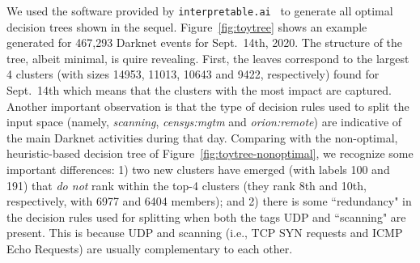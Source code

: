 \documentclass[manuscript, nonacm]{acmart}
\begin{document}
We used the software provided by \texttt{interpretable.ai}~\cite{interpretableai} to generate all optimal decision 
trees shown in the sequel. Figure~\ref{fig:toytree}
shows an example generated for 467,293 Darknet events for Sept.\ 14th, 2020. 
The structure of the tree, albeit minimal, is quire revealing.
First, the leaves correspond to the largest 4 clusters (with sizes
14953, 11013, 10643 and 9422, respectively) 
found for Sept.\ 14th which means that the clusters with the most impact are captured. 
Another important observation is that the type of decision rules used to split
the input space (namely, \emph{scanning}, \emph{censys:mgtm} and \emph{orion:remote})
are indicative of the main Darknet activities during that day. 
Comparing with the non-optimal, heuristic-based decision tree of Figure~\ref{fig:toytree-nonoptimal},
we recognize some important differences: 1) two new clusters have emerged (with labels 100 and 191)
that \emph{do not} rank within the top-4 clusters (they rank 8th and 10th, respectively, with 6977 and
6404 members); and 2) there is some ``redundancy" 
in the decision rules used for splitting when both the tags UDP and ``scanning"
are present. This is because UDP and scanning (i.e., TCP SYN requests and ICMP Echo Requests)
are usually complementary to each other. 
\end{document}
